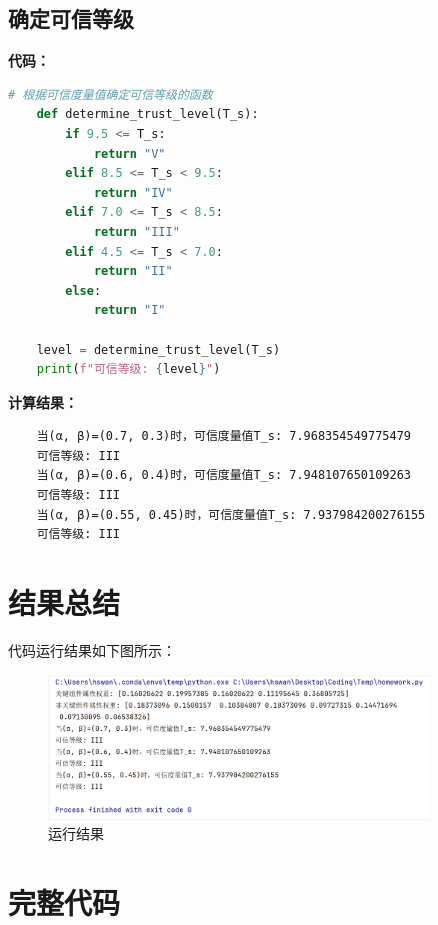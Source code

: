 \documentclass{article}
\begin{document}
\subsection{确定可信等级}

\textbf{代码：}

\begin{lstlisting}[language=Python]
	# 根据可信度量值确定可信等级的函数
	def determine_trust_level(T_s):
		if 9.5 <= T_s:
			return "V"
		elif 8.5 <= T_s < 9.5:
			return "IV"
		elif 7.0 <= T_s < 8.5:
			return "III"
		elif 4.5 <= T_s < 7.0:
			return "II"
		else:
			return "I"
	
	level = determine_trust_level(T_s)
	print(f"可信等级: {level}")
\end{lstlisting}

\textbf{计算结果：}

\begin{lstlisting}
	当(α, β)=(0.7, 0.3)时，可信度量值T_s: 7.968354549775479
	可信等级: III
	当(α, β)=(0.6, 0.4)时，可信度量值T_s: 7.948107650109263
	可信等级: III
	当(α, β)=(0.55, 0.45)时，可信度量值T_s: 7.937984200276155
	可信等级: III
\end{lstlisting}

\normalsize

\section{结果总结}

代码运行结果如下图所示：

\begin{figure}[H]
	\centering
	\includegraphics[width=0.9\textwidth]{img/1.png}
	\caption{运行结果}
\end{figure}

\normalsize

\section{完整代码}
\end{document}
